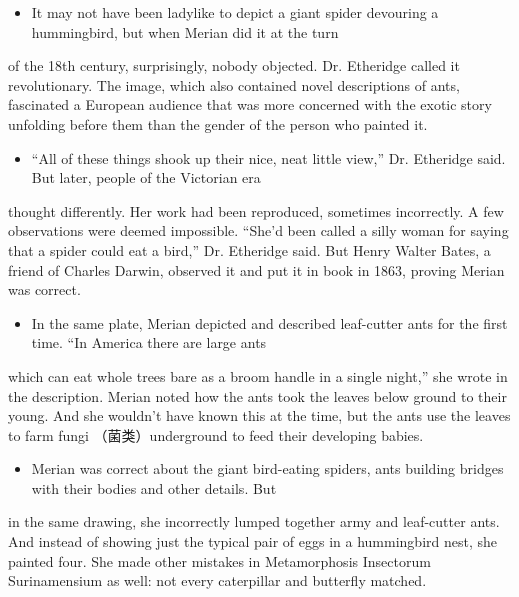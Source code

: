 \documentclass[UTF8,11pt]{ctexart}
\begin{document}
\begin{itemize}[leftmargin=2em,itemsep=.2em,topsep=.4em]\item[I.] It may not have been ladylike to depict a giant spider devouring a hummingbird, but when Merian did it at the turn
\end{itemize}

of the 18th century, surprisingly, nobody objected. Dr. Etheridge called it revolutionary. The image, which also contained novel descriptions of ants, fascinated a European audience that was more concerned with the exotic story unfolding before them than the gender of the person who painted it.


\begin{itemize}[leftmargin=2em,itemsep=.2em,topsep=.4em]\item[J.] “All of these things shook up their nice, neat little view,” Dr. Etheridge said. But later, people of the Victorian era
\end{itemize}

thought differently. Her work had been reproduced, sometimes incorrectly. A few observations were deemed impossible. “She'd been called a silly woman for saying that a spider could eat a bird,” Dr. Etheridge said. But Henry Walter Bates, a friend of Charles Darwin, observed it and put it in book in 1863, proving Merian was correct.


\begin{itemize}[leftmargin=2em,itemsep=.2em,topsep=.4em]\item[K.] In the same plate, Merian depicted and described leaf-cutter ants for the first time. “In America there are large ants
\end{itemize}

which can eat whole trees bare as a broom handle in a single night,” she wrote in the description. Merian noted how the ants took the leaves below ground to their young. And she wouldn't have known this at the time, but the ants use the leaves to farm fungi （菌类）underground to feed their developing babies.


\begin{itemize}[leftmargin=2em,itemsep=.2em,topsep=.4em]\item[L.] Merian was correct about the giant bird-eating spiders, ants building bridges with their bodies and other details. But
\end{itemize}

in the same drawing, she incorrectly lumped together army and leaf-cutter ants. And instead of showing just the typical pair of eggs in a hummingbird nest, she painted four. She made other mistakes in Metamorphosis Insectorum Surinamensium as well: not every caterpillar and butterfly matched.
\end{document}
